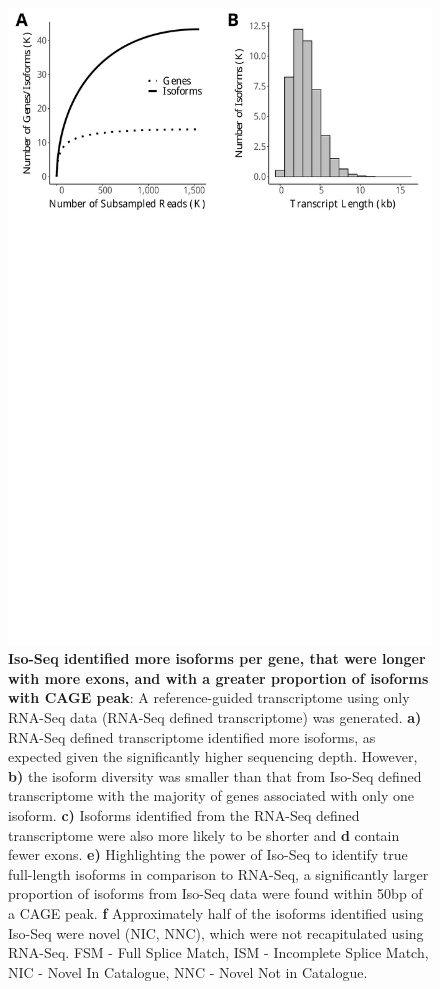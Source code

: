 \begin{figure}[htp]
	\begin{center}
		\includegraphics[page=9,trim={0 13cm 0 0},scale = 0.55]{Figures/IsoSeqWholeTranscriptome.pdf}
	\end{center}
	\captionsetup{width=0.95\textwidth}
	\caption[RNA-Seq defined transcriptome]%
	{\textbf{Iso-Seq identified more isoforms per gene, that were longer with more exons, and with a greater proportion of isoforms with CAGE peak}: A reference-guided transcriptome using only RNA-Seq data (RNA-Seq defined transcriptome) was generated. \textbf{a)} RNA-Seq defined transcriptome identified more isoforms, as expected given the significantly higher sequencing depth. However, \textbf{b)} the isoform diversity was smaller than that from Iso-Seq defined transcriptome with the majority of genes associated with only one isoform. \textbf{c)} Isoforms identified from the RNA-Seq defined transcriptome were also more likely to be shorter and \textbf{d} contain fewer exons. \textbf{e)} Highlighting the power of Iso-Seq to identify true full-length isoforms in comparison to RNA-Seq, a significantly larger proportion of isoforms from Iso-Seq data were found within 50bp of a CAGE peak. \textbf{f} Approximately half of the isoforms identified using Iso-Seq were novel (NIC, NNC), which were not recapitulated using RNA-Seq. FSM - Full Splice Match, ISM - Incomplete Splice Match, NIC - Novel In Catalogue, NNC - Novel Not in Catalogue.}   

\end{figure}
